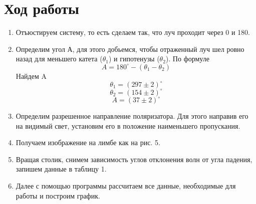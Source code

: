 \documentclass[a4paper, 12pt]{article}%
\begin{document}
\section*{Ход работы}
\begin{enumerate}
\item Отъюстируем систему, то есть сделаем так, что луч проходит через 0 и 180.
\item Определим угол А, для этого добьемся, чтобы отраженный луч шел ровно назад для меньшего катета ($\theta_1$) и гипотенузы ($\theta_2$). По формуле 
\[A = 180^{\circ} - (\theta_1 - \theta_2)\]
Найдем A
\[\theta_1 = (297 \pm 2)^{\circ}\]
\[\theta_2 = (154 \pm 2)^{\circ}\]
\[A = (37 \pm 2)^{\circ}\]
\item Определим разрешенное направление поляризатора. Для этого направив его на видимый свет, установим его в положение наименьшего пропускания.
\item Получаем изображение на лимбе как на рис. 5.
\item Вращая столик, снимем зависимость углов отклонения волн от угла падения, запишем данные в таблицу 1.
\item Далее с помощью программы рассчитаем все данные, необходимые для работы и построим график.


\end{enumerate}
\end{document}
